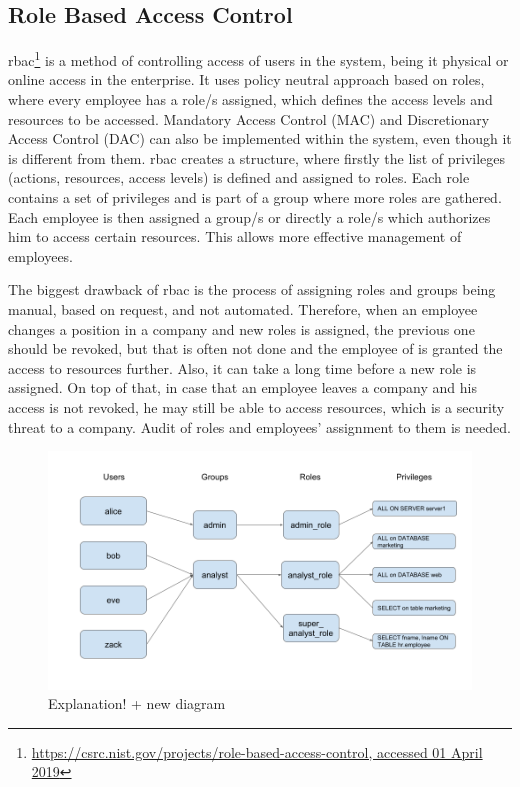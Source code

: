 \subsection{Role Based Access Control} \label{RBAC_SOTA}

\acrfull{rbac}\footnote{\url{https://csrc.nist.gov/projects/role-based-access-control, accessed 01 April 2019}} is a method of controlling access of users in the system, being it physical or online access in the enterprise. It uses policy neutral approach based on roles, where every employee has a role/s assigned, which defines the access levels and resources to be accessed. Mandatory Access Control (MAC) and Discretionary Access Control (DAC) can also be implemented within the system, even though it is different from them. \acrshort{rbac} creates a structure, where firstly the list of privileges (actions, resources, access levels) is defined and assigned to roles. Each role contains a set of privileges and is part of a group where more roles are gathered. Each employee is then assigned a group/s or directly a role/s which authorizes him to access certain resources. This allows more effective management of employees.

The biggest drawback of \acrshort{rbac} is the process of assigning roles and groups being manual, based on request, and not automated. Therefore, when an employee changes a position in a company and new roles is assigned, the previous one should be revoked, but that is often not done and the employee of is granted the access to resources further. Also, it can take a long time before a new role is assigned. On top of that, in case that an employee leaves a company and his access is not revoked, he may still be able to access resources, which is a security threat to a company. Audit of roles and employees’ assignment to them is needed.

\begin{figure}[ht]
    \centering
    \includegraphics[width=.95\textwidth]{00images/RBAC}
    \caption{Explanation! + new diagram}
    \label{fig:RBAC_diagram_sota}
\end{figure}